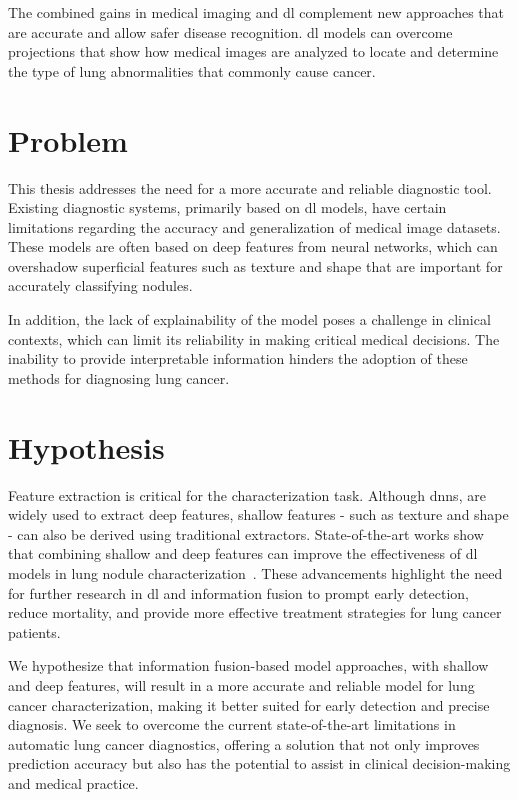 The combined gains in medical imaging and \ac{dl} complement new approaches that are accurate and allow safer disease recognition. \ac{dl} models can overcome projections that show how medical images are analyzed to locate and determine the type of lung abnormalities that commonly cause cancer.


\section{Problem}\label{sec:problem}
This thesis addresses the need for a more accurate and reliable diagnostic tool. Existing diagnostic systems, primarily based on \ac{dl} models, have certain limitations regarding the accuracy and generalization of medical image datasets. These models are often based on deep features from neural networks, which can overshadow superficial features such as texture and shape that are important for accurately classifying nodules.

In addition, the lack of explainability of the model poses a challenge in clinical contexts, which can limit its reliability in making critical medical decisions. The inability to provide interpretable information hinders the adoption of these methods for diagnosing lung cancer.


\section{Hypothesis}\label{sec:hypothesis}
Feature extraction is critical for the characterization task. 
Although \acp{dnn}, are widely used to extract deep features, shallow features - such as texture and shape - can also be derived using traditional extractors. State-of-the-art works show that combining shallow and deep features can improve the effectiveness of \ac{dl} models in lung nodule characterization~\cite{xie_fusing_2018}.
These advancements highlight the need for further research in \ac{dl} and information fusion to prompt early detection, reduce mortality, and provide more effective treatment strategies for lung cancer patients.

We hypothesize that information fusion-based model approaches, with shallow and deep features, will result in a more accurate and reliable model for lung cancer characterization, making it better suited for early detection and precise diagnosis. We seek to overcome the current state-of-the-art limitations in automatic lung cancer diagnostics, offering a solution that not only improves prediction accuracy but also has the potential to assist in clinical decision-making and medical practice.


